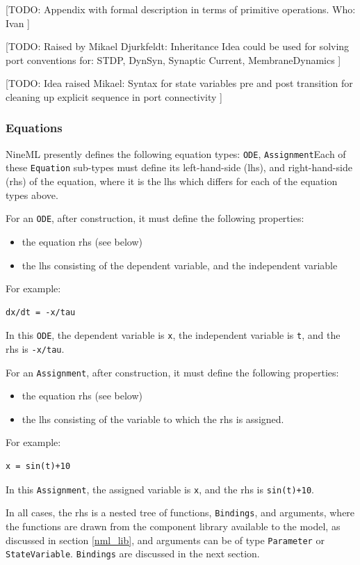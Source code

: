 \documentclass[a4paper]{article}
\newcommand\nmlClass[1]{{\tt #1}}
\begin{document}
[TODO:
Appendix with formal description in terms of primitive operations.
Who: Ivan
]

[TODO:
Raised by Mikael Djurkfeldt: Inheritance
Idea could be used for solving port conventions for: 
STDP, DynSyn, Synaptic Current, MembraneDynamics  
]

[TODO:
Idea raised Mikael: Syntax for state variables pre and post 
transition for cleaning up explicit sequence in port connectivity
]

\subsubsection{Equations}

NineML presently defines the following equation types: \nmlClass{ODE},
\nmlClass{Assignment}Each of these \nmlClass{Equation} sub-types must define its
left-hand-side (lhs), and right-hand-side (rhs) of the equation, where
it is the lhs which differs for each of the equation types above.

For an \nmlClass{ODE}, after construction, it must define the following properties:
\begin{itemize}
\item the equation rhs (see below)
\item the lhs consisting of the dependent variable, and the independent variable
\end{itemize} 
For example:
\begin{lstlisting}[style=display]
dx/dt = -x/tau
\end{lstlisting}
In this \nmlClass{ODE}, the dependent variable is \verb^x^, the independent
variable is \verb^t^, and the rhs is \verb^-x/tau^.

For an \nmlClass{Assignment}, after construction, it must define the following properties:
\begin{itemize}
\item the equation rhs (see below)
\item the lhs consisting of the variable to which the rhs is assigned.
\end{itemize}
For example:
\begin{lstlisting}[style=display]
x = sin(t)+10
\end{lstlisting}
In this \nmlClass{Assignment}, the assigned variable is \verb^x^, and the rhs is \verb^sin(t)+10^.

In all cases, the rhs is a nested tree of functions, \nmlClass{Bindings}, and arguments,
where the functions are drawn from the component library available to
the model, as discussed in section \ref{nml_lib}, and arguments
can be of type \nmlClass{Parameter} or \nmlClass{StateVariable}.  \nmlClass{Bindings} are discussed in the next section.
\end{document}
